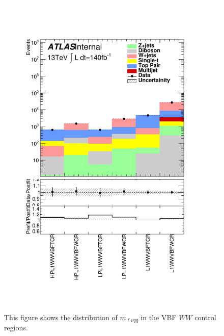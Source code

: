 \begin{figure}[h!]
  \centering
  \includegraphics[width=\hsize]{figures/results/HVTWWVBF/PlotyieldTable_postfit.pdf}
 \caption{This figure shows the distribution of $m_{\ell\nu qq}$ in the VBF $WW$ control regions.} 
  \label{fig:hvtwwvbf_cr_postfit}
\end{figure} 
\FloatBarrier

